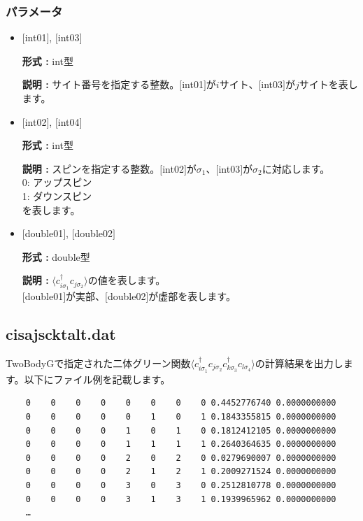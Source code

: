 \subsubsection{パラメータ}
 \begin{itemize}

  \item  $[$int01$]$, $[$int03$]$

 {\bf 形式 :} int型

{\bf 説明 :} サイト番号を指定する整数。$[$int01$]$が$i$サイト、$[$int03$]$が$j$サイトを表します。
 
  \item  $[$int02$]$, $[$int04$]$

 {\bf 形式 :} int型 

{\bf 説明 :} スピンを指定する整数。$[$int02$]$が$\sigma_1$、$[$int03$]$が$\sigma_2$に対応します。\\
0: アップスピン\\
1: ダウンスピン\\
を表します。

  \item  $[$double01$]$, $[$double02$]$

 {\bf 形式 :} double型 

{\bf 説明 :} $\langle c_{i\sigma_1}^{\dagger}c_{j\sigma_2}\rangle$の値を表します。\\
$[$double01$]$が実部、$[$double02$]$が虚部を表します。\\
\end{itemize}

\newpage
\subsection{cisajscktalt.dat}
\label{Subsec:cisajscktalt}
TwoBodyGで指定された二体グリーン関数$\langle c_{i\sigma_1}^{\dagger}c_{j\sigma_2}c_{k\sigma_3}^{\dagger}c_{l\sigma_4}\rangle$の計算結果を出力します。以下にファイル例を記載します。

\begin{minipage}{15cm}
\begin{screen}
\begin{verbatim}
    0    0    0    0    0    0    0    0 0.4452776740 0.0000000000
    0    0    0    0    0    1    0    1 0.1843355815 0.0000000000
    0    0    0    0    1    0    1    0 0.1812412105 0.0000000000
    0    0    0    0    1    1    1    1 0.2640364635 0.0000000000
    0    0    0    0    2    0    2    0 0.0279690007 0.0000000000
    0    0    0    0    2    1    2    1 0.2009271524 0.0000000000
    0    0    0    0    3    0    3    0 0.2512810778 0.0000000000
    0    0    0    0    3    1    3    1 0.1939965962 0.0000000000
    …
\end{verbatim}
\end{screen}
\end{minipage}

